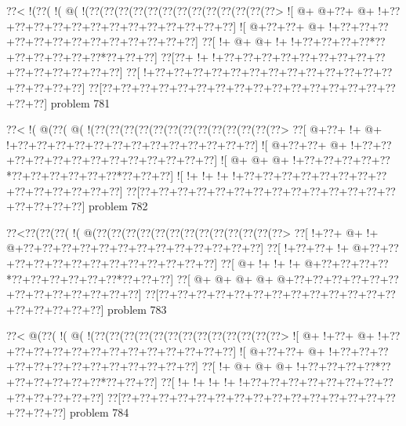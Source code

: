 \vbox{\vbox{\goo
\0??<\- !(\0??(\- !(\- @(\- !(\0??(\0??(\0??(\0??(\0??(\0??(\0??(\0??(\0??(\0??(\0??(\0??(\0??>
\- ![\- @+\- @+\0??+\- @+\- !+\0??+\0??+\0??+\0??+\0??+\0??+\0??+\0??+\0??+\0??+\0??+\0??+\0??]
\- ![\- @+\0??+\0??+\- @+\- !+\0??+\0??+\0??+\0??+\0??+\0??+\0??+\0??+\0??+\0??+\0??+\0??+\0??]
\0??[\- !+\- @+\- @+\- !+\- !+\0??+\0??+\0??+\0??*\0??+\0??+\0??+\0??+\0??+\0??*\0??+\0??+\0??]
\0??[\0??+\- !+\- !+\0??+\0??+\0??+\0??+\0??+\0??+\0??+\0??+\0??+\0??+\0??+\0??+\0??+\0??+\0??]
\0??[\- !+\0??+\0??+\0??+\0??+\0??+\0??+\0??+\0??+\0??+\0??+\0??+\0??+\0??+\0??+\0??+\0??+\0??]
\0??[\0??+\0??+\0??+\0??+\0??+\0??+\0??+\0??+\0??+\0??+\0??+\0??+\0??+\0??+\0??+\0??+\0??+\0??]
}
\hfil problem 781\hfil\break
}



\vbox{\vbox{\goo
\0??<\- !(\- @(\0??(\- @(\- !(\0??(\0??(\0??(\0??(\0??(\0??(\0??(\0??(\0??(\0??(\0??(\0??(\0??>
\0??[\- @+\0??+\- !+\- @+\- !+\0??+\0??+\0??+\0??+\0??+\0??+\0??+\0??+\0??+\0??+\0??+\0??+\0??]
\- ![\- @+\0??+\0??+\- @+\- !+\0??+\0??+\0??+\0??+\0??+\0??+\0??+\0??+\0??+\0??+\0??+\0??+\0??]
\- ![\- @+\- @+\- @+\- !+\0??+\0??+\0??+\0??+\0??*\0??+\0??+\0??+\0??+\0??+\0??*\0??+\0??+\0??]
\- ![\- !+\- !+\- !+\- !+\0??+\0??+\0??+\0??+\0??+\0??+\0??+\0??+\0??+\0??+\0??+\0??+\0??+\0??]
\0??[\0??+\0??+\0??+\0??+\0??+\0??+\0??+\0??+\0??+\0??+\0??+\0??+\0??+\0??+\0??+\0??+\0??+\0??]
}
\hfil problem 782\hfil\break
}



\vbox{\vbox{\goo
\0??<\0??(\0??(\0??(\- !(\- @(\0??(\0??(\0??(\0??(\0??(\0??(\0??(\0??(\0??(\0??(\0??(\0??(\0??>
\0??[\- !+\0??+\- @+\- !+\- @+\0??+\0??+\0??+\0??+\0??+\0??+\0??+\0??+\0??+\0??+\0??+\0??+\0??]
\0??[\- !+\0??+\0??+\- !+\- @+\0??+\0??+\0??+\0??+\0??+\0??+\0??+\0??+\0??+\0??+\0??+\0??+\0??]
\0??[\- @+\- !+\- !+\- !+\- @+\0??+\0??+\0??+\0??*\0??+\0??+\0??+\0??+\0??+\0??*\0??+\0??+\0??]
\0??[\- @+\- @+\- @+\- @+\- @+\0??+\0??+\0??+\0??+\0??+\0??+\0??+\0??+\0??+\0??+\0??+\0??+\0??]
\0??[\0??+\0??+\0??+\0??+\0??+\0??+\0??+\0??+\0??+\0??+\0??+\0??+\0??+\0??+\0??+\0??+\0??+\0??]
}
\hfil problem 783\hfil\break
}



\vbox{\vbox{\goo
\0??<\- @(\0??(\- !(\- @(\- !(\0??(\0??(\0??(\0??(\0??(\0??(\0??(\0??(\0??(\0??(\0??(\0??(\0??>
\- ![\- @+\- !+\0??+\- @+\- !+\0??+\0??+\0??+\0??+\0??+\0??+\0??+\0??+\0??+\0??+\0??+\0??+\0??]
\- ![\- @+\0??+\0??+\- @+\- !+\0??+\0??+\0??+\0??+\0??+\0??+\0??+\0??+\0??+\0??+\0??+\0??+\0??]
\0??[\- !+\- @+\- @+\- @+\- !+\0??+\0??+\0??+\0??*\0??+\0??+\0??+\0??+\0??+\0??*\0??+\0??+\0??]
\0??[\- !+\- !+\- !+\- !+\- !+\0??+\0??+\0??+\0??+\0??+\0??+\0??+\0??+\0??+\0??+\0??+\0??+\0??]
\0??[\0??+\0??+\0??+\0??+\0??+\0??+\0??+\0??+\0??+\0??+\0??+\0??+\0??+\0??+\0??+\0??+\0??+\0??]
}
\hfil problem 784\hfil\break
}



